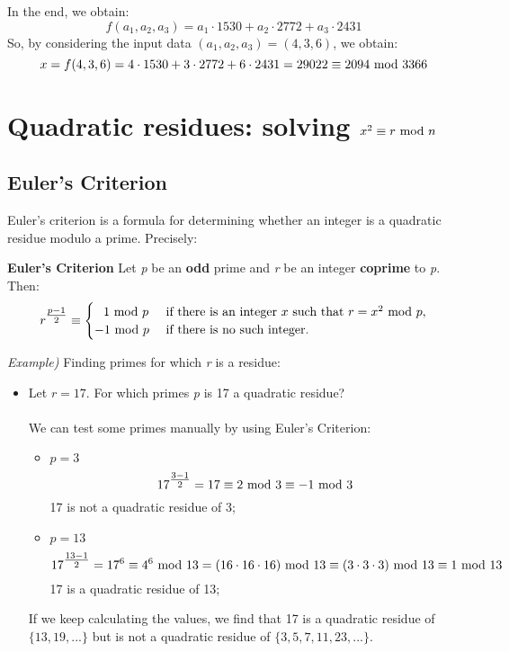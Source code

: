 In the end, we obtain:
$$f(a_1,a_2,a_3)=a_1\cdot1530+a_2\cdot2772+a_3\cdot2431$$
So, by considering the input data $(a_1,a_2,a_3)=(4,3,6)$, we obtain:
$$x=f(4,3,6)=4\cdot1530+3\cdot2772+6\cdot2431=29022\equiv2094\text{ mod }3366$$

\newpage
\section{Quadratic residues: solving $x^2\equiv r\text{ mod } n$}
\subsection{Euler's Criterion}
Euler's criterion is a formula for determining whether an integer is a quadratic residue modulo a prime. Precisely:
\begin{framed}
\hfill\break\textbf{Euler's Criterion} Let \textit{p} be an \textbf{odd} prime and \textit{r} be an integer \textbf{coprime} to \textit{p}. Then:
\begin{equation*}
    r^{\tfrac{p-1}{2}}\equiv
    \begin{cases}
        \;\;\,1{\text{ mod } p}&{\text{ if there is an integer }}x{\text{ such that }}r=x^{2}{\text{ mod } p},\\
        -1{\text{ mod } p}&{\text{ if there is no such integer.}}
    \end{cases}
\end{equation*}
\end{framed}\hfill\break
\textit{Example)} Finding primes for which \textit{r} is a residue:
\begin{itemize}
    \item[] Let $r=17$. For which primes \textit{p} is 17 a quadratic residue?\\\\
    We can test some primes manually by using Euler's Criterion:
    \begin{itemize}
        \item $p=3$
        $$\displaystyle 17^{\tfrac{3-1}{2}}=17\equiv 2\text{ mod }3\equiv-1\text{ mod }3$$
        17 is not a quadratic residue of 3;
        \item $p=13$
        $$\displaystyle 17^{\tfrac{13-1}{2}}=17^6\equiv4^6\text{ mod }13=(16\cdot16\cdot16)\text{ mod }13\equiv(3\cdot3\cdot3)\text{ mod }13\equiv1\text{ mod }13$$
        17 is a quadratic residue of 13;
    \end{itemize}
    If we keep calculating the values, we find that 17 is a quadratic residue of $\{13,19,...\}$ but is not a quadratic residue of $\{3,5,7,11,23,...\}$.
\end{itemize}
